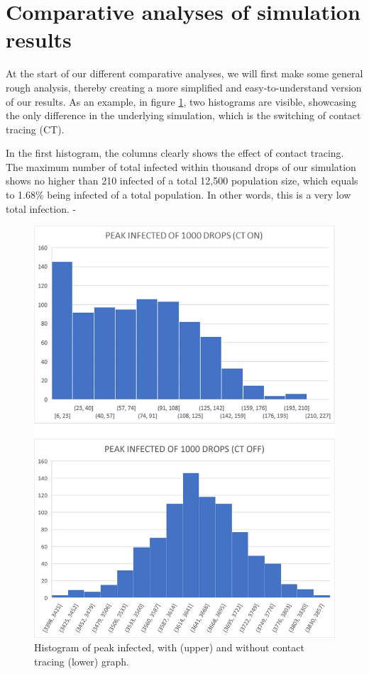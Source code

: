 \section{Comparative analyses of simulation results}

At the start of our different comparative analyses, we will first make some general rough analysis, thereby creating a more simplified and easy-to-understand version of our results. As an example, in figure \ref{fig:peak_infected}, two histograms are visible, showcasing the only difference in the underlying simulation, which is the switching of contact tracing (CT). 

In the first histogram, the columns clearly shows the effect of contact tracing. The maximum number of total infected within thousand drops of our simulation shows no higher than 210 infected of a total 12,500 population size, which equals to 1.68\% being infected of a total population. In other words, this is a very low total infection. 
-
\begin{figure}[H]
  \centering
  \includegraphics[width=\textwidth]{0_billeder/Peak_infected_graph.png}
  \caption{Histogram of peak infected, with (upper) and without contact tracing (lower) graph.}
  \label{fig:peak_infected}
\end{figure}


